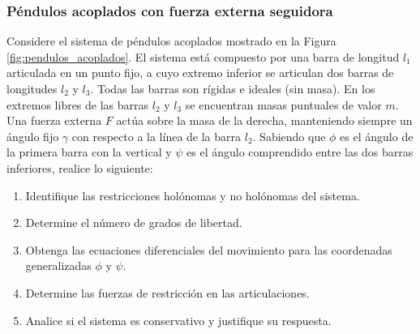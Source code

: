 \subsubsection{Péndulos acoplados con fuerza externa seguidora}

Considere el sistema de péndulos acoplados mostrado en la Figura \ref{fig:pendulos_acoplados}. El sistema está compuesto por una barra de longitud $l_1$ articulada en un punto fijo, a cuyo extremo inferior se articulan dos barras de longitudes $l_2$ y $l_3$. Todas las barras son rígidas e ideales (sin masa). En los extremos libres de las barras $l_2$ y $l_3$ se encuentran masas puntuales de valor $m$. Una fuerza externa $F$ actúa sobre la masa de la derecha, manteniendo siempre un ángulo fijo $\gamma$ con respecto a la línea de la barra $l_2$. Sabiendo que $\phi$ es el ángulo de la primera barra con la vertical y $\psi$ es el ángulo comprendido entre las dos barras inferiores, realice lo siguiente:

\begin{enumerate}
    \item Identifique las restricciones holónomas y no holónomas del sistema.
    \item Determine el número de grados de libertad.
    \item Obtenga las ecuaciones diferenciales del movimiento para las coordenadas generalizadas $\phi$ y $\psi$.
    \item Determine las fuerzas de restricción en las articulaciones.
    \item Analice si el sistema es conservativo y justifique su respuesta.
\end{enumerate}

